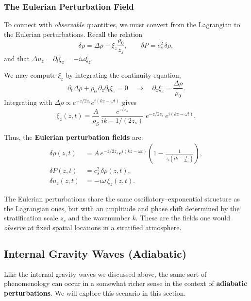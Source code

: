 \subsubsection*{The Eulerian Perturbation Field}

To connect with \emph{observable} quantities, we must convert from the Lagrangian to the Eulerian perturbations. Recall the relation
\[
\delta \rho = \Delta \rho - \xi_z \frac{\rho_0}{z_s},
\qquad 
\delta P = c_s^2 \, \delta \rho,
\]
and that $\Delta u_z = \partial_t \xi_z = -i\omega \xi_z$.

\vspace{0.25cm}
\noindent
We may compute $\xi_z$ by integrating the continuity equation,
\[
\partial_t \Delta \rho + \rho_0 \, \partial_z \partial_t \xi_z = 0
\quad\Rightarrow\quad
\partial_z \xi_z = \frac{\Delta \rho}{\rho_0}.
\]
Integrating with $\Delta \rho \propto e^{-z/2z_s} e^{i(kz - \omega t)}$ gives
\[
\xi_z(z,t) = \frac{A}{\rho_S}\, 
\frac{e^{z/z_s}}{ik - 1/(2z_s)}
\; e^{-z/2z_s}\, e^{i(kz - \omega t)}.
\]

\vspace{0.5cm}
\noindent
Thus, the \textbf{Eulerian perturbation fields} are:
\begin{equation}
\boxed{
\begin{aligned}
\delta \rho(z,t) &= A\, e^{-z/2z_s} e^{i(kz - \omega t)}
\left(1 - \frac{1}{z_s\!\left(ik - \tfrac{1}{2z_s}\right)}\right), \\
\delta P(z,t) &= c_s^2 \, \delta \rho(z,t), \\
\delta u_z(z,t) &= -i\omega \, \xi_z(z,t).
\end{aligned}
}
\end{equation}

\vspace{0.25cm}
\begin{remark}
The Eulerian perturbations share the same oscillatory–exponential structure as the Lagrangian ones, but with an amplitude and phase shift determined by the stratification scale $z_s$ and the wavenumber $k$.  
These are the fields one would \emph{observe} at fixed spatial locations in a stratified atmosphere.
\end{remark}

\subsection{Internal Gravity Waves (Adiabatic)}

Like the internal gravity waves we discussed above, the same sort of phenomenology can occur in a somewhat richer sense in the context of \textbf{adiabatic perturbations}. We will explore this scenario in this section.

